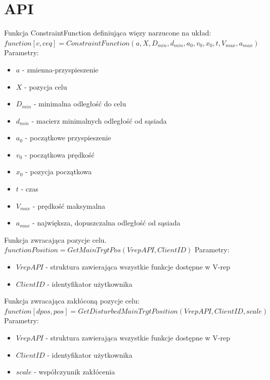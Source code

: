 \documentclass[a4paper, 11pt, oneside]{article}
\begin{document}
\section{API}
Funkcja ConstraintFunction definiująca więzy narzucone na układ:
\newline
 $function [c,ceq]=ConstraintFunction(a,X,D_{min},d_{min},a_{0},v_{0},x_{0},t,V_{max},a_{max})$\newline
Parametry:
\begin{itemize}
\item $a$ -  zmienna-przyspieszenie
\item $X$ - pozycja celu
\item $D_{min}$ -  minimalna odległość do celu
\item $d_{min}$ -  macierz minimalnych odległość od sąsiada
\item $a_{0}$ - początkowe przyspieszenie
\item $v_{0}$  - początkowa prędkość
\item $x_{0}$ - pozycja początkowa
\item $t$ - czas
\item $V_{max}$ - prędkość maksymalna
\item $a_{max}$ - największa, dopuszczalna odległość od sąsiada
\end{itemize}

Funkcja zwracająca pozycje celu.
\newline
$function Position = GetMainTrgtPos(VrepAPI, ClientID)$
\newline
Parametry:
\begin{itemize}
\item $VrepAPI$ - struktura zawierająca wszystkie funkcje dostępne w V-rep
\item $ClientID$ - identyfikator użytkownika
\end{itemize}

Funkcja zwracająca zakłóconą pozycje celu: 
\newline
$function [dpos, pos]=GetDisturbedMainTrgtPosition(VrepAPI, ClientID, scale)$
\newline
Parametry:
\begin{itemize}
\item $VrepAPI$ - struktura zawierająca wszystkie funkcje dostępne w V-rep
\item $ClientID$ - identyfikator użytkownika
\item $scale$ - współczynnik zakłócenia
\end{itemize}
\end{document}
